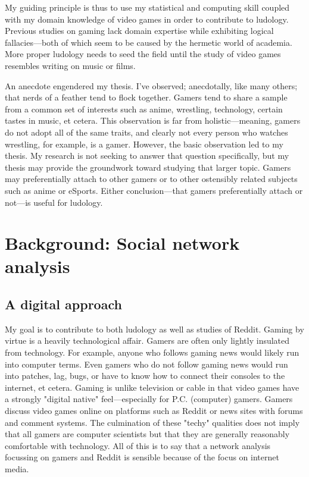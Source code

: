 \documentclass[12pt, a4paper]{article}
\begin{document}
My guiding principle is thus to use my statistical and computing skill coupled with my domain knowledge of video games in order to contribute to ludology. Previous studies on gaming lack domain expertise while exhibiting logical fallacies---both of which seem to be caused by the hermetic world of academia. More proper ludology needs to seed the field until the study of video games resembles writing on music or films. 

An anecdote engendered my thesis. I've observed; anecdotally, like many others; that nerds of a feather tend to flock together. Gamers tend to share a sample from a common set of interests such as anime, wrestling, technology, certain tastes in music, et cetera. This observation is far from holistic---meaning, gamers do not adopt all of the same traits, and clearly not every person who watches wrestling, for example, is a gamer. However, the basic observation led to my thesis. My research is not seeking to answer that question specifically, but my thesis may provide the groundwork toward studying that larger topic. Gamers may preferentially attach to other gamers or to other ostensibly related subjects such as anime or eSports. Either conclusion---that gamers preferentially attach or not---is useful for ludology. 

\section{Background: Social network analysis}

\subsection{A digital approach}
My goal is to contribute to both ludology as well as studies of Reddit. Gaming by virtue is a heavily technological affair. Gamers are often only lightly insulated from technology. For example, anyone who follows gaming news would likely run into computer terms. Even gamers who do not follow gaming news would run into patches, lag, bugs, or have to know how to connect their consoles to the internet, et cetera. Gaming is unlike television or cable in that video games have a strongly "digital native" feel---especially for P.C. (computer) gamers. Gamers discuss video games online on platforms such as Reddit or news sites with forums and comment systems. The culmination of these "techy" qualities does not imply that all gamers are computer scientists but that they are generally reasonably comfortable with technology. All of this is to say that a network analysis focussing on gamers and Reddit is sensible because of the focus on internet media.
\end{document}
